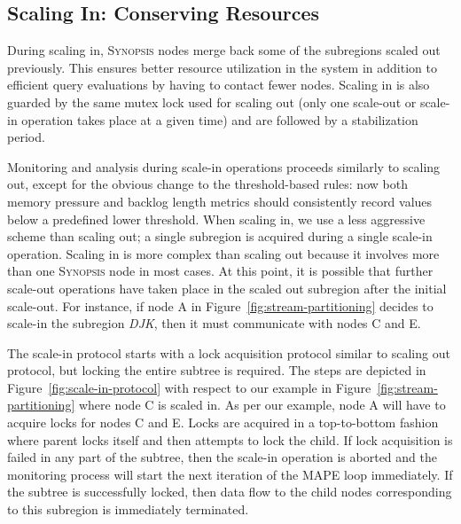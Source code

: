 \subsection{Scaling In: Conserving Resources}
\label{subsec:scaling-in}
During scaling in, \textsc{Synopsis} nodes merge back some of the subregions scaled out previously.
This ensures better resource utilization in the system in addition to efficient query evaluations by having to contact fewer nodes.
Scaling in is also guarded by the same mutex lock used for scaling out (only one scale-out or scale-in operation takes place at a given time) and are followed by a stabilization period.

Monitoring and analysis during scale-in operations proceeds similarly to scaling out, except for the obvious change to the threshold-based rules: now both memory pressure and backlog length metrics should consistently record values below a predefined lower threshold.
When scaling in, we use a less aggressive scheme than scaling out; a single subregion is acquired during a single scale-in operation.
Scaling in is more complex than scaling out because it involves more than one \textsc{Synopsis} node in most cases.
At this point, it is possible that further scale-out operations have taken place in the scaled out subregion after the initial scale-out.
For instance, if node A in Figure~\ref{fig:stream-partitioning} decides to scale-in the subregion \emph{DJK}, then it must communicate with nodes C and E.

The scale-in protocol starts with a lock acquisition protocol similar to scaling out protocol, but locking the entire subtree is required.
The steps are depicted in Figure~\ref{fig:scale-in-protocol} with respect to our example in Figure~\ref{fig:stream-partitioning} where node C is scaled in.
As per our example, node A will have to acquire locks for nodes C and E.
Locks are acquired in a top-to-bottom fashion where parent locks itself and then attempts to lock the child.
If lock acquisition is failed in any part of the subtree, then the scale-in operation is aborted and the monitoring process will start the next iteration of the MAPE loop immediately.
If the subtree is successfully locked, then data flow to the child nodes corresponding to this subregion is immediately terminated.

